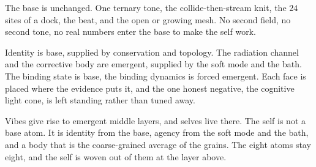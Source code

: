 The base is unchanged. One ternary tone, the collide-then-stream knit, the $24$ sites of a dock, the beat, and the open or growing mesh. No second field, no second tone, no real numbers enter the base to make the self work.

Identity is base, supplied by conservation and topology. The radiation channel and the corrective body are emergent, supplied by the soft mode and the bath. The binding state is base, the binding dynamics is forced emergent. Each face is placed where the evidence puts it, and the one honest negative, the cognitive light cone, is left standing rather than tuned away.

\begin{principle}
Vibes give rise to emergent middle layers, and selves live there. The self is not a base atom. It is identity from the base, agency from the soft mode and the bath, and a body that is the coarse-grained average of the grains. The eight atoms stay eight, and the self is woven out of them at the layer above.
\end{principle}
